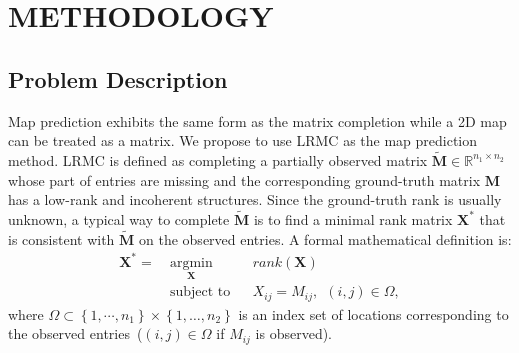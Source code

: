\section{METHODOLOGY}
\label{sect:method}

\subsection{Problem Description}
Map prediction exhibits the same form as the matrix completion \cite{recht2009simpler} while a 2D map can be treated as a matrix. We propose to use LRMC as the map prediction method. LRMC is defined as completing a partially observed matrix $\tilde{\mathbf{M}}\in\mathbb{R}^{n_1\times n_2}$ whose part of entries are missing and the corresponding ground-truth matrix $\mathbf{M}$ has a low-rank and incoherent structures. Since the ground-truth rank is usually unknown, a typical way to complete $\tilde{\mathbf{M}}$ is to find a minimal rank matrix $\mathbf{X}^*$ that is consistent with $\tilde{\mathbf{M}}$ on the observed entries. A formal mathematical definition is:
\begin{equation}
    \label{eq:mc_1}
    \begin{aligned}
        \mathbf{X}^* = ~&\underset{\mathbf{X}}{\text{argmin}} 
               &&rank(\mathbf{X})\\
               &\text{subject to}
               && X_{ij} = M_{ij},~~\left ( i, j \right )\in \Omega,
    \end{aligned}
\end{equation}
where $\Omega \subset \left \{ 1, \cdots, n_1 \right \}\times \left \{ 1, \dots, n_2 \right \} $ is an index set of locations corresponding to the observed entries~($\left ( i, j \right )\in \Omega$ if $M_{ij}$ is observed). 

